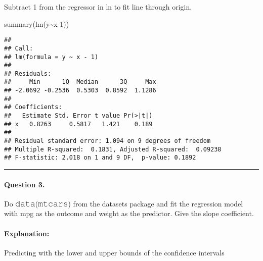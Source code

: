 \documentclass[
]{article}
\newenvironment{Shaded}{\begin{snugshade}}{\end{snugshade}}
\newcommand{\DecValTok}[1]{\textcolor[rgb]{0.00,0.00,0.81}{#1}}
\newcommand{\FunctionTok}[1]{\textcolor[rgb]{0.00,0.00,0.00}{#1}}
\newcommand{\NormalTok}[1]{#1}
\newcommand{\OtherTok}[1]{\textcolor[rgb]{0.56,0.35,0.01}{#1}}
\newcommand{\SpecialCharTok}[1]{\textcolor[rgb]{0.00,0.00,0.00}{#1}}
\begin{document}
Subtract 1 from the regressor in ln to fit line through origin.

\begin{Shaded}
\begin{Highlighting}[]
\FunctionTok{summary}\NormalTok{(}\FunctionTok{lm}\NormalTok{(y}\SpecialCharTok{\textasciitilde{}}\NormalTok{x}\DecValTok{{-}1}\NormalTok{))}
\end{Highlighting}
\end{Shaded}

\begin{verbatim}
## 
## Call:
## lm(formula = y ~ x - 1)
## 
## Residuals:
##     Min      1Q  Median      3Q     Max 
## -2.0692 -0.2536  0.5303  0.8592  1.1286 
## 
## Coefficients:
##   Estimate Std. Error t value Pr(>|t|)
## x   0.8263     0.5817   1.421    0.189
## 
## Residual standard error: 1.094 on 9 degrees of freedom
## Multiple R-squared:  0.1831, Adjusted R-squared:  0.09238 
## F-statistic: 2.018 on 1 and 9 DF,  p-value: 0.1892
\end{verbatim}

\begin{center}\rule{0.5\linewidth}{0.5pt}\end{center}

\hypertarget{question-3.}{%
\paragraph{Question 3.}\label{question-3.}}

Do 𝚍𝚊𝚝𝚊(𝚖𝚝𝚌𝚊𝚛𝚜) from the datasets package and fit the regression model
with mpg as the outcome and weight as the predictor. Give the slope
coefficient.

\hypertarget{explanation-2}{%
\paragraph{Explanation:}\label{explanation-2}}

Predicting with the lower and upper bounds of the confidence intervals

\begin{Shaded}
\end{Shaded}
\end{document}
